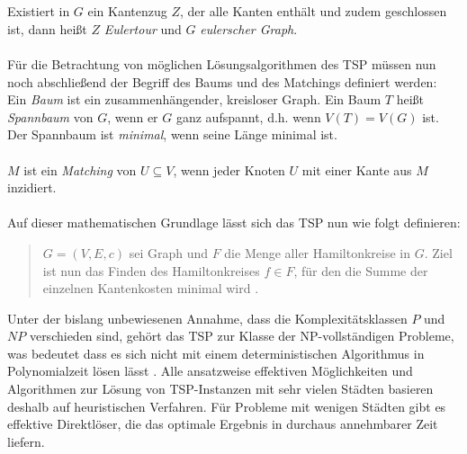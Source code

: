 \documentclass[doktyp=barbeit, sprache=german]{TUBAFarbeiten}
\begin{document}
\\\\Existiert in $G$ ein Kantenzug $Z$, der alle Kanten enthält und zudem geschlossen ist, dann heißt $Z$ \textit{Eulertour} und $G$ \textit{eulerscher Graph}.
\\\\Für die Betrachtung von möglichen Lösungsalgorithmen des TSP müssen nun noch abschließend der Begriff des Baums und des Matchings definiert werden:
\\Ein \textit{Baum} ist ein zusammenhängender, kreisloser Graph. Ein Baum $T$ heißt \textit{Spannbaum} von $G$, wenn er $G$ ganz aufspannt, d.h. wenn $V(T) = V(G)$ ist. Der Spannbaum ist \textit{minimal}, wenn seine Länge minimal ist.
\\\\$M$ ist ein \textit{Matching} von $U \subseteq V$, wenn jeder Knoten $U$ mit einer Kante aus $M$ inzidiert.
\\\\Auf dieser mathematischen Grundlage lässt sich das TSP nun wie folgt definieren: 
\begin{quotation}
$G = (V,E,c)$ sei Graph und $F$ die Menge aller Hamiltonkreise in $G$. Ziel ist nun das Finden des Hamiltonkreises $f \in F$, für den die Summe der einzelnen Kantenkosten minimal wird \cite{TSPVariations}.
\end{quotation}
Unter der bislang unbewiesenen Annahme, dass die Komplexitätsklassen $P$ und $NP$ verschieden sind, gehört das TSP zur Klasse der NP-vollständigen Probleme, was bedeutet dass es sich nicht mit einem deterministischen Algorithmus in Polynomialzeit lösen lässt \cite{Applegate2007}.  Alle ansatzweise effektiven Möglichkeiten und Algorithmen zur Lösung von TSP-Instanzen mit sehr vielen Städten basieren deshalb auf heuristischen Verfahren. Für Probleme mit wenigen Städten gibt es effektive Direktlöser, die das optimale Ergebnis in durchaus annehmbarer Zeit liefern.
\end{document}
